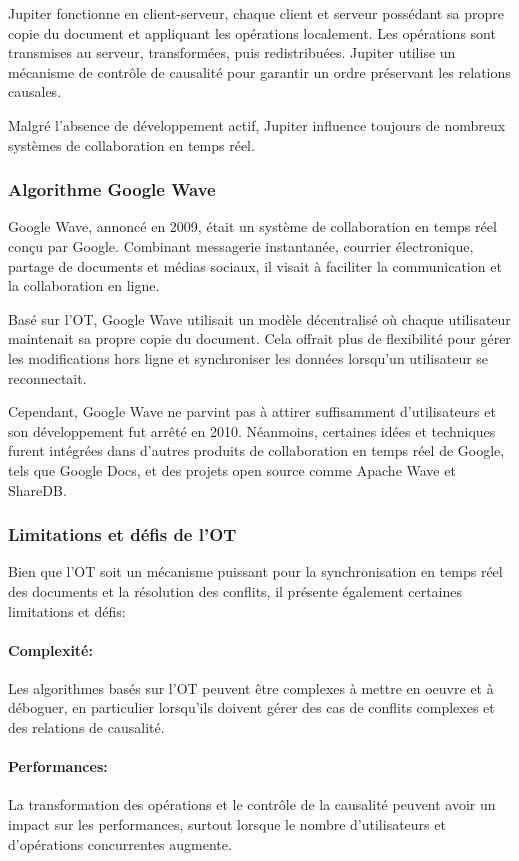 Jupiter fonctionne en client-serveur, chaque client et serveur possédant sa propre copie du document et appliquant les opérations localement. Les opérations sont transmises au serveur, transformées, puis redistribuées. Jupiter utilise un mécanisme de contrôle de causalité pour garantir un ordre préservant les relations causales.

Malgré l'absence de développement actif, Jupiter influence toujours de nombreux systèmes de collaboration en temps réel.

\subsubsection{Algorithme Google Wave}
Google Wave, annoncé en 2009, était un système de collaboration en temps réel conçu par Google. Combinant messagerie instantanée, courrier électronique, partage de documents et médias sociaux, il visait à faciliter la communication et la collaboration en ligne.

Basé sur l'OT, Google Wave utilisait un modèle décentralisé où chaque utilisateur maintenait sa propre copie du document. Cela offrait plus de flexibilité pour gérer les modifications hors ligne et synchroniser les données lorsqu'un utilisateur se reconnectait.

Cependant, Google Wave ne parvint pas à attirer suffisamment d'utilisateurs et son développement fut arrêté en 2010. Néanmoins, certaines idées et techniques furent intégrées dans d'autres produits de collaboration en temps réel de Google, tels que Google Docs, et des projets open source comme Apache Wave et ShareDB.

\subsubsection{Limitations et défis de l'OT}
Bien que l'OT soit un mécanisme puissant pour la synchronisation en temps réel des documents et la résolution des conflits, il présente également certaines limitations et défis:

\paragraph{Complexité:} Les algorithmes basés sur l'OT peuvent être complexes à mettre en oeuvre et à déboguer, en particulier lorsqu'ils doivent gérer des cas de conflits complexes et des relations de causalité.
\paragraph{Performances:} La transformation des opérations et le contrôle de la causalité peuvent avoir un impact sur les performances, surtout lorsque le nombre d'utilisateurs et d'opérations concurrentes augmente.
